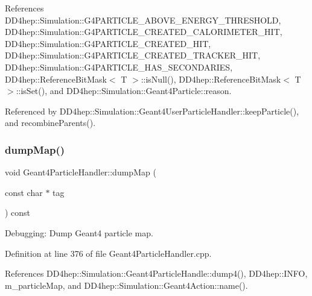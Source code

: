 References D\+D4hep\+::\+Simulation\+::\+G4\+P\+A\+R\+T\+I\+C\+L\+E\+\_\+\+A\+B\+O\+V\+E\+\_\+\+E\+N\+E\+R\+G\+Y\+\_\+\+T\+H\+R\+E\+S\+H\+O\+LD, D\+D4hep\+::\+Simulation\+::\+G4\+P\+A\+R\+T\+I\+C\+L\+E\+\_\+\+C\+R\+E\+A\+T\+E\+D\+\_\+\+C\+A\+L\+O\+R\+I\+M\+E\+T\+E\+R\+\_\+\+H\+IT, D\+D4hep\+::\+Simulation\+::\+G4\+P\+A\+R\+T\+I\+C\+L\+E\+\_\+\+C\+R\+E\+A\+T\+E\+D\+\_\+\+H\+IT, D\+D4hep\+::\+Simulation\+::\+G4\+P\+A\+R\+T\+I\+C\+L\+E\+\_\+\+C\+R\+E\+A\+T\+E\+D\+\_\+\+T\+R\+A\+C\+K\+E\+R\+\_\+\+H\+IT, D\+D4hep\+::\+Simulation\+::\+G4\+P\+A\+R\+T\+I\+C\+L\+E\+\_\+\+H\+A\+S\+\_\+\+S\+E\+C\+O\+N\+D\+A\+R\+I\+ES, D\+D4hep\+::\+Reference\+Bit\+Mask$<$ T $>$\+::is\+Null(), D\+D4hep\+::\+Reference\+Bit\+Mask$<$ T $>$\+::is\+Set(), and D\+D4hep\+::\+Simulation\+::\+Geant4\+Particle\+::reason.



Referenced by D\+D4hep\+::\+Simulation\+::\+Geant4\+User\+Particle\+Handler\+::keep\+Particle(), and recombine\+Parents().

\hypertarget{class_d_d4hep_1_1_simulation_1_1_geant4_particle_handler_aa1c03db235f55f52a150a2849d7aa882}{}\label{class_d_d4hep_1_1_simulation_1_1_geant4_particle_handler_aa1c03db235f55f52a150a2849d7aa882} 
\subsubsection{\texorpdfstring{dump\+Map()}{dumpMap()}}
{\footnotesize\ttfamily void Geant4\+Particle\+Handler\+::dump\+Map (\begin{DoxyParamCaption}\item[{const char $\ast$}]{tag }\end{DoxyParamCaption}) const\hspace{0.3cm}{\ttfamily [protected]}}



Debugging\+: Dump Geant4 particle map. 



Definition at line 376 of file Geant4\+Particle\+Handler.\+cpp.



References D\+D4hep\+::\+Simulation\+::\+Geant4\+Particle\+Handle\+::dump4(), D\+D4hep\+::\+I\+N\+FO, m\+\_\+particle\+Map, and D\+D4hep\+::\+Simulation\+::\+Geant4\+Action\+::name().



